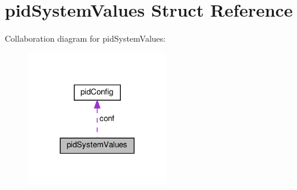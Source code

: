 \hypertarget{structpidSystemValues}{}\section{pid\+System\+Values Struct Reference}
\label{structpidSystemValues}


Collaboration diagram for pid\+System\+Values\+:
\nopagebreak
\begin{figure}[H]
\begin{center}
\leavevmode
\includegraphics[width=173pt]{structpidSystemValues__coll__graph}
\end{center}
\end{figure}
